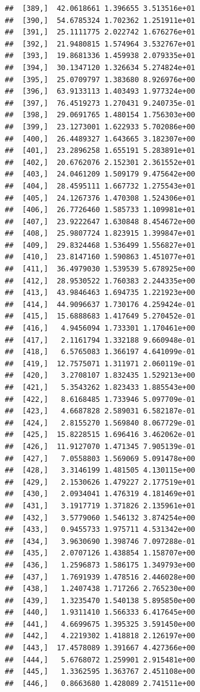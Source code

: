\documentclass[article]{jss}\usepackage[]{graphicx}\usepackage[]{xcolor}
\makeatletter
\newenvironment{kframe}{%
 \def\at@end@of@kframe{}%
 \ifinner\ifhmode%
  \def\at@end@of@kframe{\end{minipage}}%
  \begin{minipage}{\columnwidth}%
 \fi\fi%
 \def\FrameCommand##1{\hskip\@totalleftmargin \hskip-\fboxsep
 \colorbox{shadecolor}{##1}\hskip-\fboxsep
     \hskip-\linewidth \hskip-\@totalleftmargin \hskip\columnwidth}%
 \MakeFramed {\advance\hsize-\width
   \@totalleftmargin\z@ \linewidth\hsize
   \@setminipage}}%
 {\par\unskip\endMakeFramed%
 \at@end@of@kframe}
\newenvironment{knitrout}{}{} %
\makeatother
\begin{document}
\begin{knitrout}
\begin{kframe}
\begin{verbatim}
##  [389,]  42.0618661 1.396655 3.513516e+01
##  [390,]  54.6785324 1.702362 1.251911e+01
##  [391,]  25.1111775 2.022742 1.676276e+01
##  [392,]  21.9480815 1.574964 3.532767e+01
##  [393,]  19.8681336 1.459938 2.079335e+01
##  [394,]  30.1347120 1.326634 5.274824e+01
##  [395,]  25.0709797 1.383680 8.926976e+00
##  [396,]  63.9133113 1.403493 1.977324e+00
##  [397,]  76.4519273 1.270431 9.240735e-01
##  [398,]  29.0691765 1.480154 1.756303e+00
##  [399,]  23.1273001 1.622933 5.702086e+00
##  [400,]  26.4489327 1.643665 3.182307e+00
##  [401,]  23.2896258 1.655191 5.283891e+01
##  [402,]  20.6762076 2.152301 2.361552e+01
##  [403,]  24.0461209 1.509179 9.475642e+00
##  [404,]  28.4595111 1.667732 1.275543e+01
##  [405,]  24.1267376 1.470308 1.524306e+01
##  [406,]  26.7726460 1.585733 1.109981e+01
##  [407,]  23.9222647 1.630848 8.454672e+00
##  [408,]  25.9807724 1.823915 1.399847e+01
##  [409,]  29.8324468 1.536499 1.556827e+01
##  [410,]  23.8147160 1.590863 1.451077e+01
##  [411,]  36.4979030 1.539539 5.678925e+00
##  [412,]  28.9530522 1.760383 2.244335e+00
##  [413,]  43.9846463 1.694735 1.221923e+00
##  [414,]  44.9096637 1.730176 4.259424e-01
##  [415,]  15.6888683 1.417649 5.270452e-01
##  [416,]   4.9456094 1.733301 1.170461e+00
##  [417,]   2.1161794 1.332188 9.660948e-01
##  [418,]   6.5765083 1.366197 4.641099e-01
##  [419,]  12.7575071 1.311971 2.060119e-01
##  [420,]   3.2708107 1.832435 1.529213e+00
##  [421,]   5.3543262 1.823433 1.885543e+00
##  [422,]   8.6168485 1.733946 5.097709e-01
##  [423,]   4.6687828 2.589031 6.582187e-01
##  [424,]   2.8155270 1.569840 8.067729e-01
##  [425,]  15.8228515 1.696416 3.462062e-01
##  [426,]  11.9127070 1.471345 7.905139e-01
##  [427,]   7.0558803 1.569069 5.091478e+00
##  [428,]   3.3146199 1.481505 4.130115e+00
##  [429,]   2.1530626 1.479227 2.177519e+01
##  [430,]   2.0934041 1.476319 4.181469e+01
##  [431,]   3.1917719 1.371826 2.135961e+01
##  [432,]   3.5779060 1.546132 3.874254e+00
##  [433,]   0.9455733 1.975711 4.531342e+00
##  [434,]   3.9630690 1.398746 7.097288e-01
##  [435,]   2.0707126 1.438854 1.158707e+00
##  [436,]   1.2596873 1.586175 1.349793e+00
##  [437,]   1.7691939 1.478516 2.446028e+00
##  [438,]   1.2407438 1.717266 2.765230e+00
##  [439,]   1.3235470 1.540138 5.895850e+00
##  [440,]   1.9311410 1.566333 6.417645e+00
##  [441,]   4.6699675 1.395325 3.591450e+00
##  [442,]   4.2219302 1.418818 2.126197e+00
##  [443,]  17.4578089 1.391667 4.427366e+00
##  [444,]   5.6768072 1.259901 2.915481e+00
##  [445,]   1.3362595 1.363767 2.451108e+00
##  [446,]   0.8663680 1.428089 2.741511e+00

\end{verbatim}
\end{kframe}
\end{knitrout}
\end{document}
